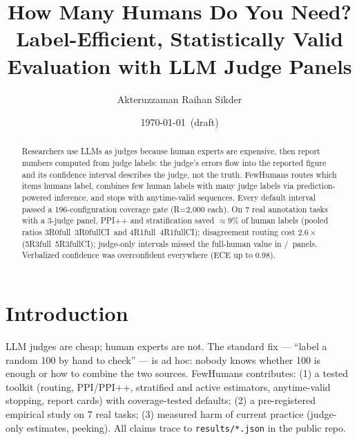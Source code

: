 \documentclass[11pt]{article}
\title{How Many Humans Do You Need?\\ Label-Efficient, Statistically Valid Evaluation with LLM Judge Panels}
\author{Akteruzzaman Raihan Sikder}
\date{\today~(draft)}
\begin{document}
\maketitle
\begin{abstract}
Researchers use LLMs as judges because human experts are expensive, then report
numbers computed from judge labels: the judge's errors flow into the reported
figure and its confidence interval describes the judge, not the truth.
FewHumans routes which items humans label, combines few human labels with many
judge labels via prediction-powered inference, and stops with anytime-valid
sequences. Every default interval passed a 196-configuration coverage gate
(R=2{,}000 each). On 7 real annotation tasks with a 3-judge panel, PPI++
and stratification saved $\approx$9\% of human labels (pooled ratios
\PooledE3R0full~\PooledE3R0fullCI\ and \PooledE4R1full~\PooledE4R1fullCI);
disagreement routing cost $2.6\times$ (\PooledE5R3full~\PooledE5R3fullCI);
judge-only intervals missed the full-human value in \HFourMiss/\HFourTot\
panels. Verbalized confidence was overconfident everywhere (ECE up to 0.98).
\end{abstract}

\section{Introduction}
LLM judges are cheap; human experts are not. The standard fix --- ``label a
random 100 by hand to check'' --- is ad hoc: nobody knows whether 100 is
enough or how to combine the two sources. FewHumans contributes: (1) a tested
toolkit (routing, PPI/PPI++, stratified and active estimators, anytime-valid
stopping, report cards) with coverage-tested defaults; (2) a pre-registered
empirical study on 7 real tasks; (3) measured harm of current practice
(judge-only estimates, peeking).
All claims trace to \texttt{results/*.json} in the public repo.
\end{document}
